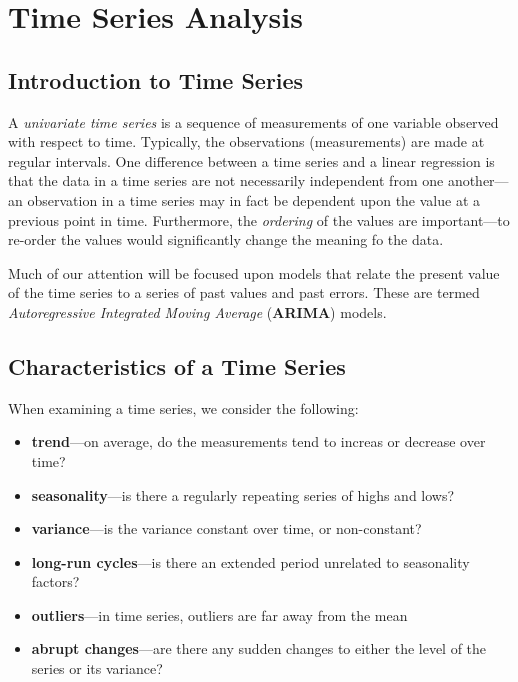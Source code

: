 \documentclass[12pt]{article}
\begin{document}
\section{Time Series Analysis}
\subsection{Introduction to Time Series}
A \textit{univariate time series} is a sequence of measurements of one variable observed with respect to time. Typically, the observations (measurements) are made at regular intervals. One difference between a time series and a linear regression is that the data in a time series are not necessarily independent from one another---an observation in a time series may in fact be dependent upon the value at a previous point in time. Furthermore, the \textit{ordering} of the values are important---to re-order the values would significantly change the meaning fo the data.

Much of our attention will be focused upon models that relate the present value of the time series to a series of past values and past errors. These are termed \textit{Autoregressive Integrated Moving Average} (\textbf{ARIMA}) models.

\subsection{Characteristics of a Time Series}
When examining a time series, we consider the following:
\begin{itemize}
\item \textbf{trend}---on average, do the measurements tend to increas or decrease over time?
\item \textbf{seasonality}---is there a regularly repeating series of highs and lows?
\item \textbf{variance}---is the variance constant over time, or non-constant?
\item \textbf{long-run cycles}---is there an extended period unrelated to seasonality factors?
\item \textbf{outliers}---in time series, outliers are far away from the mean
\item \textbf{abrupt changes}---are there any sudden changes to either the level of the series or its variance?
\end{itemize}
\end{document}
